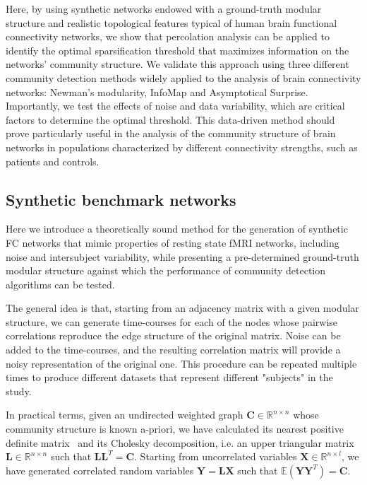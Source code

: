 Here, by using synthetic networks endowed with a ground-truth modular structure and realistic topological features typical of human brain functional connectivity networks, we show that percolation analysis can be applied to identify the optimal sparsification threshold that maximizes information on the networks' community structure.
We validate this approach using three different community detection methods widely applied to the analysis of brain connectivity networks: Newman's modularity, InfoMap and Asymptotical Surprise.
Importantly, we test the effects of noise and data variability, which are critical factors to determine the optimal threshold.
This data-driven method should prove particularly useful in the analysis of the community structure of brain networks in populations characterized by different connectivity strengths, such as patients and controls.


\subsection{Synthetic benchmark networks}
Here we introduce a theoretically sound method for the generation of synthetic FC networks that mimic properties of resting state fMRI networks, including noise and intersubject variability, while presenting a pre-determined ground-truth modular structure against which the performance of community detection algorithms can be tested.

The general idea is that, starting from an adjacency matrix with a given modular structure, we can generate time-courses for each of the nodes whose pairwise correlations reproduce the edge structure of the original matrix. Noise can be added to the time-courses, and the resulting correlation matrix will provide a noisy representation of the original one. This procedure can be repeated multiple times to produce different datasets that represent different "subjects" in the study.

In practical terms, given an undirected weighted graph  $\mathbf{C} \in \mathbb{R}^{n\times n}$ whose community structure is known a-priori, we have calculated its nearest positive definite matrix~\cite{higham1988} and its Cholesky decomposition, i.e. an upper triangular matrix $\mathbf{L}\in \mathbb{R}^{n\times n}$ such that $\mathbf{L}\mathbf{L}^T=\mathbf{C}$. Starting from uncorrelated variables $\mathbf{X} \in \mathbb{R}^{n \times l}$, we have generated correlated random variables $\mathbf{Y}=\mathbf{L} \mathbf{X}$ such that $\mathbb{E}(\mathbf{Y}\mathbf{Y}^T)=\mathbf{C}$.

